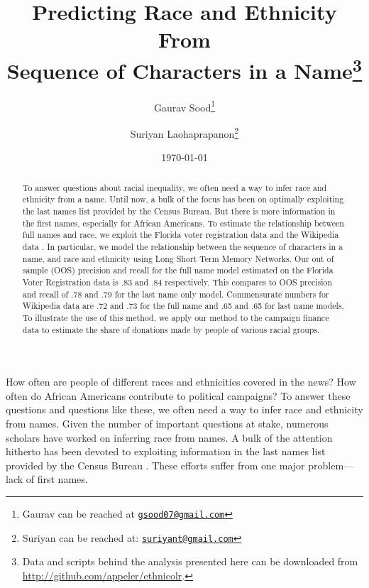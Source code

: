 \documentclass[12pt, letterpaper]{article}
\title{\Large{Predicting Race and Ethnicity From\\Sequence of Characters in a Name}\footnote{Data and scripts behind the analysis presented here can be downloaded from \url{http://github.com/appeler/ethnicolr}.
}}
\author{Gaurav Sood\thanks{Gaurav can be reached at \href{mailto:gsood07@gmail.com}{\footnotesize{\texttt{gsood07@gmail.com}}}} \and Suriyan Laohaprapanon\thanks{Suriyan can be reached at: \href{mailto:suriyant@gmail.com}{\footnotesize{\texttt{suriyant@gmail.com}}}}\vspace{.5cm}}
\date{\vspace{.5cm}\normalsize{\today}}
\begin{document}
\maketitle

\begin{center}
\end{center}

\begin{comment}

setwd(paste0(githubdir, "ethnicolr_paper/"))
tools::texi2dvi("name_race.tex", pdf = TRUE, clean = TRUE) 
setwd(basedir)

\end{comment}


\begin{abstract}
To answer questions about racial inequality, we often need a way to infer race and ethnicity from a name. Until now, a bulk of the focus has been on optimally exploiting the last names list provided by the Census Bureau. But there is more information in the first names, especially for African Americans. To estimate the relationship between full names and race, we exploit the Florida voter registration data and the Wikipedia data \citep{ambekar2009name}. In particular, we model the relationship between the sequence of characters in a name, and race and ethnicity using Long Short Term Memory Networks. Our out of sample (OOS) precision and recall for the full name model estimated on the Florida Voter Registration data is .83 and .84 respectively. This compares to OOS precision and recall of .78 and .79 for the last name only model. Commensurate numbers for Wikipedia data are .72 and .73 for the full name and .65 and .65 for last name models. To illustrate the use of this method, we apply our method to the campaign finance data to estimate the share of donations made by people of various racial groups.
\end{abstract}
\clearpage
\doublespace

How often are people of different races and ethnicities covered in the news? How often do African Americans contribute to political campaigns? To answer these questions and questions like these, we often need a way to infer race and ethnicity from names. Given the number of important questions at stake, numerous scholars have worked on inferring race from names. A bulk of the attention hitherto has been devoted to exploiting information in the last names list provided by the Census Bureau \citep[see, e.g.,][]{fiscella2006use, imai2016improving}. These efforts suffer from one major problem---lack of first names. 
\end{document}

